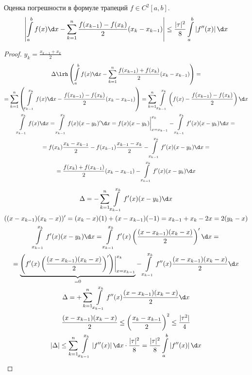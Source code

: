 \begin{theorem}{Оценка погрешности в формуле трапеций}
	$f \in C^2[a, b]$.
	\[ \left| \int\limits_a^b f(x)\d x - \sum_{k=1}^n \frac{f(x_{k-1}) - f(x_k)}{2}(x_k - x_{k-1}) \right| \le \frac{|\tau|^2}8 \int\limits_a^b \left|f''(x)\right|\d x \]
\end{theorem}
\begin{proof}
	$y_k = \frac{x_{k-1} + x_k}2$
	\begin{gather*}
		\Delta \lrh \left(\int\limits_a^b f(x)\d x - \sum_{k=1}^n \frac{f(x_{k-1}) + f(x_k)}{2}(x_k - x_{k-1}) \right) = \\
		= \sum_{k=1}^n \left(\int\limits_{x_{k-1}}^{x_k} f(x)\d x - \frac{f(x_{k-1}) - f(x_k)}{2}(x_k - x_{k-1}) \right)
			= \sum_{k=1}^n \int\limits_{x_{k-1}}^{x_k} \left(f(x) - \frac{f(x_{k-1}) - f(x_k)}{2}\right)\d x \\
		\int\limits_{x_{k-1}}^{x_k} f(x) \d x = \int\limits_{x_{k-1}}^{x_k} f(x)(x - y_k)'\d x = f(x) (x-y_k) \biggr|_{x=x_{k-1}}^{x_k} - \int\limits_{x_{k-1}}^{x_k} f'(x)(x-y_k)\d x = \\
		= f(x_k) \frac{x_k - x_{k-1}}2 - f(x_{k-1}) \frac{x_{k-1} - x_k}2 - \int\limits_{x_{k-1}}^{x_k} f'(x)(x-y_k)\d x = \\
		= \frac{f(x_k) + f(x_{k-1})}2 (x_k - x_{k-1}) - \int\limits_{x_{k-1}}^{x_k} f'(x)(x-y_k)\d x \\
	\end{gather*}
	\begin{gather*}
		\Delta = -\sum_{k=1}^n \int\limits_{x_{k-1}}^{x_k} f'(x)(x-y_k)\d x \\
		((x - x_{k-1})(x_k - x))' = (x_k - x)(1) + (x - x_{k-1})(-1) = x_{k-1} + x_k - 2x = 2(y_k - x) \\
		\int\limits_{x_{k-1}}^{x_k} f'(x)(x-y_k)\d x = \int\limits_{x_{k-1}}^{x_k} f'(x)\left(\frac{(x - x_{k-1})(x_k - x)}2\right)'\d x = \\
		= \underbrace{\left(f'(x)\left(\frac{(x - x_{k-1})(x_k - x)}2\right)'\right)\biggr|_{x = x_{k-1}}^{x_k}}_{=0} - \int\limits_{x_{k-1}}^{x_k} f''(x) \frac{(x - x_{k-1})(x_k - x)}2 \d x \\
		\Delta = +\sum_{k=1}^n \int\limits_{x_{k-1}}^{x_k} f''(x) \frac{(x - x_{k-1})(x_k - x)}2 \d x \\
		\frac{(x - x_{k-1})(x_k - x)}2 \le \left(\frac{x_k - x_{k-1}}2\right)^2 \le \frac{|\tau^2|}4 \\
		|\Delta| \le \sum_{k=1}^n \int\limits_{x_{k-1}}^{x_k} \left|f''(x)\right| \d x \cdot \frac{|\tau|^2}8 = \frac{|\tau|^2}8 \int\limits_a^b \left|f''(x)\right|\d x
	\end{gather*}
\end{proof}

